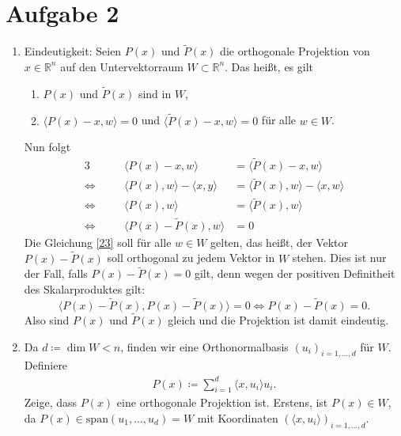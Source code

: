 \documentclass[9pt]{extarticle}
\theoremstyle{named}
\begin{document}
\section*{Aufgabe 2}
\begin{enumerate}[label=(\roman*)]
	\item Eindeutigkeit: Seien $P(x)$ und $\tilde P(x)$ die orthogonale Projektion von $x \in \mathbb R^n$ auf den Untervektorraum $W \subset \mathbb R^n$. Das heißt, es gilt
	\begin{enumerate}
		\item $P(x)$ und $\tilde P(x)$ sind in $W$,
		\item $\langle P(x)-x, w \rangle = 0$ und $\langle \tilde P(x)-x, w \rangle = 0$ für alle $w \in W$.
	\end{enumerate}
	Nun folgt
	\begin{alignat*}{3}
		 &&\langle P(x)-x, w \rangle &=  \langle \tilde P(x)-x, w \rangle  \\
		\iff \quad && \langle P(x),w\rangle - \langle x,y \rangle &= \langle \tilde P(x), w \rangle - \langle x,w \rangle\\
		\iff \quad && \langle P(x),w\rangle &= \langle \tilde P(x), w \rangle \\
		\iff \quad && \langle P(x)- \tilde P(x), w \rangle &= 0 \tag{1} \label{23}
	\end{alignat*}
	Die Gleichung \eqref{23} soll für alle $w \in W$ gelten, das heißt, der Vektor $P(x)- \tilde P(x)$ soll orthogonal zu jedem Vektor in $W$ stehen. Dies ist nur der Fall, falls $P(x)- \tilde P(x) = 0$ gilt, denn wegen der positiven Definitheit des Skalarproduktes gilt:
	\[
		\langle P(x)- \tilde P(x), P(x)- \tilde P(x) \rangle = 0 \iff P(x)- \tilde P(x) = 0.
	\]
	Also sind $P(x)$ und $\tilde P(x)$ gleich und die Projektion ist damit eindeutig.
	
	\item Da $d \coloneqq \dim W < n$, finden wir eine Orthonormalbasis $(u_i)_{i=1,...,d}$ für $W$. Definiere
	\begin{align*}
		P(x) \coloneqq \sum^{d}_{i=1} \langle x,u_i \rangle u_i.
	\end{align*}
	Zeige, dass $P(x)$ eine orthogonale Projektion ist. Erstens, ist $P(x) \in W$, da $P(x) \in \mathrm{span}(u_1,...,u_d) = W$ mit Koordinaten $(\langle x,u_i \rangle)_{i=1,...,d}$.
	

\end{enumerate}
\end{document}
